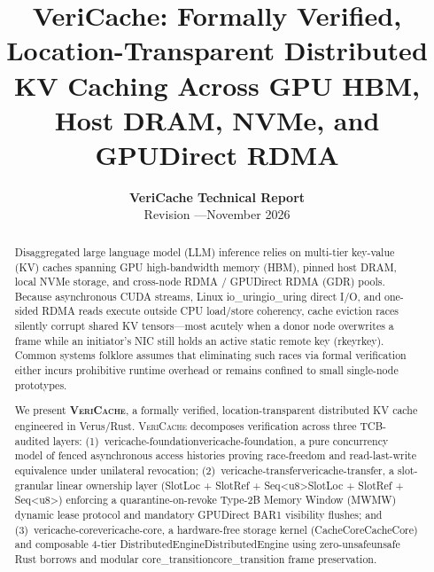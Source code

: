 \documentclass[11pt,a4paper]{article}
\title{\textbf{VeriCache: Formally Verified, Location-Transparent Distributed KV Caching Across GPU HBM, Host DRAM, NVMe, and GPUDirect RDMA}}
\author{
  \textbf{VeriCache Technical Report} \\
  \small Revision \code{f476bf7} \quad---\quad November 2026
}
\date{}
\let\origunderscore\_
\DeclareRobustCommand{\code}[1]{{\ttfamily\ifmmode #1\else\def\_{\origunderscore\hspace{0pt}}#1\fi}}
\newcommand{\VC}{\textsc{VeriCache}}
\begin{document}
\maketitle

\begin{abstract}
Disaggregated large language model (LLM) inference relies on multi-tier key-value (KV) caches spanning GPU high-bandwidth memory (HBM), pinned host DRAM, local NVMe storage, and cross-node RDMA / GPUDirect RDMA (GDR) pools. Because asynchronous CUDA streams, Linux \code{io\_uring} direct I/O, and one-sided RDMA reads execute outside CPU load/store coherency, cache eviction races silently corrupt shared KV tensors---most acutely when a donor node overwrites a frame while an initiator's NIC still holds an active static remote key (\code{rkey}). Common systems folklore assumes that eliminating such races via formal verification either incurs prohibitive runtime overhead or remains confined to small single-node prototypes.

We present \textbf{\VC{}}, a formally verified, location-transparent distributed KV cache engineered in Verus/Rust. \VC{} decomposes verification across three TCB-audited layers: (1)~\code{vericache-foundation}, a pure concurrency model of fenced asynchronous access histories proving race-freedom and read-last-write equivalence under unilateral revocation; (2)~\code{vericache-transfer}, a slot-granular linear ownership layer (\code{SlotLoc + SlotRef + Seq<u8>}) enforcing a quarantine-on-revoke Type-2B Memory Window (\code{MW}) dynamic lease protocol and mandatory GPUDirect BAR1 visibility flushes; and (3)~\code{vericache-core}, a hardware-free storage kernel (\code{CacheCore}) and composable 4-tier \code{DistributedEngine} using zero-\code{unsafe} Rust borrows and modular \code{core\_transition} frame preservation.


\end{abstract}
\end{document}
